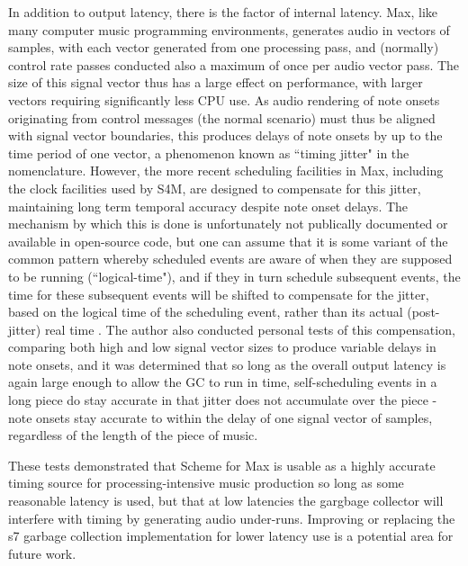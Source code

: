 \documentclass[acmsmall]{acmart}
\begin{document}
In addition to output latency, there is the factor of internal latency.
Max, like many computer music programming environments, generates audio 
in vectors of samples, with
each vector generated from one processing pass, and (normally) control
rate passes conducted also a maximum of once per audio vector pass. The
size of this signal vector thus has a large effect on performance, with larger
vectors requiring significantly less CPU use. As audio rendering of note onsets originating
from control messages (the normal scenario) must thus be aligned with 
signal vector boundaries, this produces delays of note onsets by up to
the time period of one vector, a phenomenon known as ``timing jitter" in the nomenclature.
However, the more recent scheduling facilities in Max, including the 
clock facilities used by S4M, are designed to compensate for this jitter,
maintaining long term temporal accuracy despite note onset delays. The mechanism
by which this is done is unfortunately not publically documented or available
in open-source code, but one can assume that it is some variant of the common pattern 
whereby scheduled events are aware of when they are supposed to be running
(``logical-time"), and if they in turn schedule subsequent events, the time for these subsequent
events will be shifted to compensate for the jitter, based 
on the logical time of the scheduling event, rather than its
actual (post-jitter) real time \cite{Anderson1986}.
The author also conducted personal tests of 
this compensation, comparing both high and low signal vector sizes to produce
variable delays in note onsets, and it was determined
that so long as the overall output latency is again large enough to allow
the GC to run in time, self-scheduling events in a long piece do stay
accurate in that jitter does not accumulate over the piece - 
note onsets stay accurate to within the delay of one signal vector of samples,
regardless of the length of the piece of music.

These tests demonstrated that Scheme for Max is usable as a highly accurate
timing source for processing-intensive music production so long as some
reasonable latency is used, but that at low latencies the gargbage
collector will interfere with timing by generating audio under-runs.
Improving or replacing the s7 garbage collection implementation for 
lower latency use is a potential area for future work. 
\end{document}
